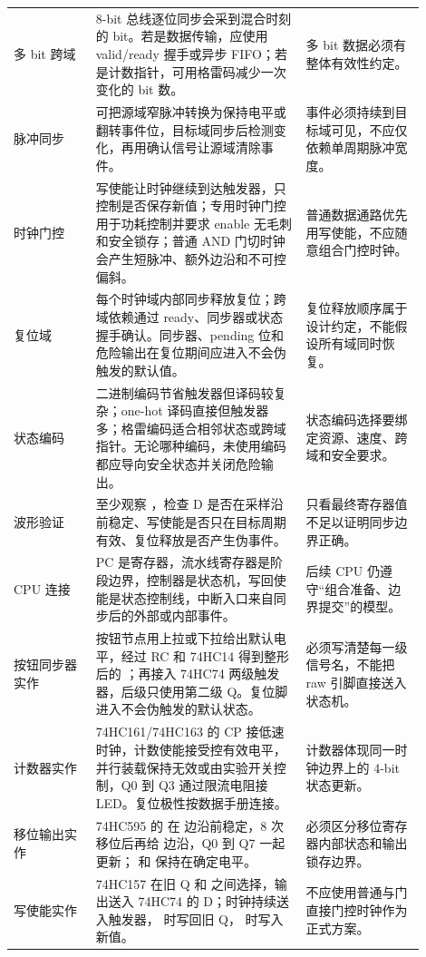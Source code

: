 \begin{longtable}{L{0.18\linewidth}L{0.46\linewidth}L{0.26\linewidth}}
多 bit 跨域 & 8-bit 总线逐位同步会采到混合时刻的 bit。若是数据传输，应使用 valid/ready 握手或异步 FIFO；若是计数指针，可用格雷码减少一次变化的 bit 数。 & 多 bit 数据必须有整体有效性约定。 \\
脉冲同步 & 可把源域窄脉冲转换为保持电平或翻转事件位，目标域同步后检测变化，再用确认信号让源域清除事件。 & 事件必须持续到目标域可见，不应仅依赖单周期脉冲宽度。 \\
时钟门控 & 写使能让时钟继续到达触发器，只控制是否保存新值；专用时钟门控用于功耗控制并要求 enable 无毛刺和安全锁存；普通 AND 门切时钟会产生短脉冲、额外边沿和不可控偏斜。 & 普通数据通路优先用写使能，不应随意组合门控时钟。 \\
复位域 & 每个时钟域内部同步释放复位；跨域依赖通过 ready、同步器或状态握手确认。同步器、pending 位和危险输出在复位期间应进入不会伪触发的默认值。 & 复位释放顺序属于设计约定，不能假设所有域同时恢复。 \\
状态编码 & 二进制编码节省触发器但译码较复杂；one-hot 译码直接但触发器多；格雷编码适合相邻状态或跨域指针。无论哪种编码，未使用编码都应导向安全状态并关闭危险输出。 & 状态编码选择要绑定资源、速度、跨域和安全要求。 \\
波形验证 & 至少观察 ，检查 D 是否在采样沿前稳定、写使能是否只在目标周期有效、复位释放是否产生伪事件。 & 只看最终寄存器值不足以证明同步边界正确。 \\
CPU 连接 & PC 是寄存器，流水线寄存器是阶段边界，控制器是状态机，写回使能是状态控制线，中断入口来自同步后的外部或内部事件。 & 后续 CPU 仍遵守“组合准备、边界提交”的模型。 \\
按钮同步器实作 & 按钮节点用上拉或下拉给出默认电平，经过 RC 和 74HC14 得到整形后的 ；再接入 74HC74 两级触发器，后级只使用第二级 Q。复位脚进入不会伪触发的默认状态。 & 必须写清楚每一级信号名，不能把 raw 引脚直接送入状态机。 \\
计数器实作 & 74HC161/74HC163 的 CP 接低速时钟，计数使能接受控有效电平，并行装载保持无效或由实验开关控制，Q0 到 Q3 通过限流电阻接 LED。复位极性按数据手册连接。 & 计数器体现同一时钟边界上的 4-bit 状态更新。 \\
移位输出实作 & 74HC595 的  在  边沿前稳定，8 次移位后再给  边沿，Q0 到 Q7 一起更新； 和  保持在确定电平。 & 必须区分移位寄存器内部状态和输出锁存边界。 \\
写使能实作 & 74HC157 在旧 Q 和  之间选择，输出送入 74HC74 的 D；时钟持续送入触发器， 时写回旧 Q， 时写入新值。 & 不应使用普通与门直接门控时钟作为正式方案。 \\

\end{longtable}
